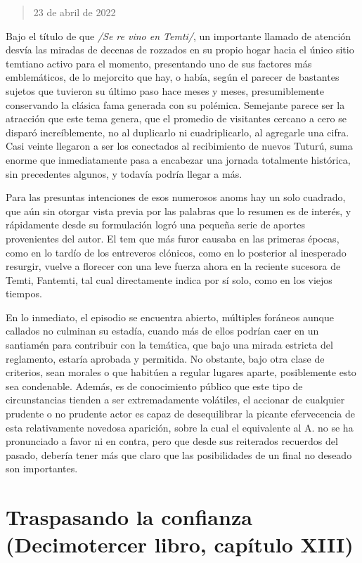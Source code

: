 \documentclass[
]{book}
\begin{document}
\begin{quote}
23 de abril de 2022
\end{quote}

Bajo el título de que \emph{/Se re vino en Temti/}, un importante llamado de atención desvía las miradas de decenas de rozzados en su propio hogar hacia el único sitio temtiano activo para el momento, presentando uno de sus factores más emblemáticos, de lo mejorcito que hay, o había, según el parecer de bastantes sujetos que tuvieron su último paso hace meses y meses, presumiblemente conservando la clásica fama generada con su polémica. Semejante parece ser la atracción que este tema genera, que el promedio de visitantes cercano a cero se disparó increíblemente, no al duplicarlo ni cuadriplicarlo, al agregarle una cifra. Casi veinte llegaron a ser los conectados al recibimiento de nuevos Tuturú, suma enorme que inmediatamente pasa a encabezar una jornada totalmente histórica, sin precedentes algunos, y todavía podría llegar a más.

Para las presuntas intenciones de esos numerosos anoms hay un solo cuadrado, que aún sin otorgar vista previa por las palabras que lo resumen es de interés, y rápidamente desde su formulación logró una pequeña serie de aportes provenientes del autor. El tem que más furor causaba en las primeras épocas, como en lo tardío de los entreveros clónicos, como en lo posterior al inesperado resurgir, vuelve a florecer con una leve fuerza ahora en la reciente sucesora de Temti, Fantemti, tal cual directamente indica por sí solo, como en los viejos tiempos.

En lo inmediato, el episodio se encuentra abierto, múltiples foráneos aunque callados no culminan su estadía, cuando más de ellos podrían caer en un santiamén para contribuir con la temática, que bajo una mirada estricta del reglamento, estaría aprobada y permitida. No obstante, bajo otra clase de criterios, sean morales o que habitúen a regular lugares aparte, posiblemente esto sea condenable. Además, es de conocimiento público que este tipo de circunstancias tienden a ser extremadamente volátiles, el accionar de cualquier prudente o no prudente actor es capaz de desequilibrar la picante efervecencia de esta relativamente novedosa aparición, sobre la cual el equivalente al A. no se ha pronunciado a favor ni en contra, pero que desde sus reiterados recuerdos del pasado, debería tener más que claro que las posibilidades de un final no deseado son importantes.

\hypertarget{traspasando-la-confianza-decimotercer-libro-capuxedtulo-xiii}{%
\section{Traspasando la confianza (Decimotercer libro, capítulo XIII)}\label{traspasando-la-confianza-decimotercer-libro-capuxedtulo-xiii}}
\end{document}
